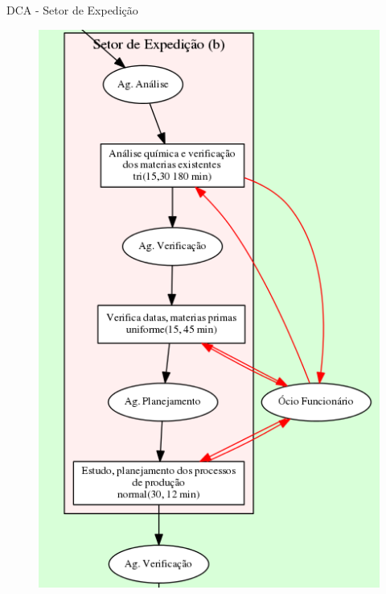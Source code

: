 \documentclass[xcolor=dvipsnames]{beamer}
\begin{document}
\begin{frame}{DCA - Setor de Expedição}
	\begin{figure}[H]
		\centering
		\includegraphics[height=0.865\textheight]{img/b.png}
	\end{figure}
\end{frame}
	
\end{document}
